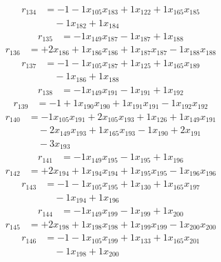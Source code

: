 \[\begin{aligned}
r_{134} &= - 1 - 1 x_{105} x_{183} + 1 x_{122} + 1 x_{165} x_{185} \\
 &\quad - 1 x_{182} + 1 x_{184}
\end{aligned}\]
\[\begin{aligned}
r_{135} &= - 1 x_{149} x_{187} - 1 x_{187} + 1 x_{188}
\end{aligned}\]
\[\begin{aligned}
r_{136} &= + 2 x_{186} + 1 x_{186} x_{186} + 1 x_{187} x_{187} - 1 x_{188} x_{188}
\end{aligned}\]
\[\begin{aligned}
r_{137} &= - 1 - 1 x_{105} x_{187} + 1 x_{125} + 1 x_{165} x_{189} \\
 &\quad - 1 x_{186} + 1 x_{188}
\end{aligned}\]
\[\begin{aligned}
r_{138} &= - 1 x_{149} x_{191} - 1 x_{191} + 1 x_{192}
\end{aligned}\]
\[\begin{aligned}
r_{139} &= - 1 + 1 x_{190} x_{190} + 1 x_{191} x_{191} - 1 x_{192} x_{192}
\end{aligned}\]
\[\begin{aligned}
r_{140} &= - 1 x_{105} x_{191} + 2 x_{105} x_{193} + 1 x_{126} + 1 x_{149} x_{191} \\
 &\quad - 2 x_{149} x_{193} + 1 x_{165} x_{193} - 1 x_{190} + 2 x_{191} \\
 &\quad - 3 x_{193}
\end{aligned}\]
\[\begin{aligned}
r_{141} &= - 1 x_{149} x_{195} - 1 x_{195} + 1 x_{196}
\end{aligned}\]
\[\begin{aligned}
r_{142} &= + 2 x_{194} + 1 x_{194} x_{194} + 1 x_{195} x_{195} - 1 x_{196} x_{196}
\end{aligned}\]
\[\begin{aligned}
r_{143} &= - 1 - 1 x_{105} x_{195} + 1 x_{130} + 1 x_{165} x_{197} \\
 &\quad - 1 x_{194} + 1 x_{196}
\end{aligned}\]
\[\begin{aligned}
r_{144} &= - 1 x_{149} x_{199} - 1 x_{199} + 1 x_{200}
\end{aligned}\]
\[\begin{aligned}
r_{145} &= + 2 x_{198} + 1 x_{198} x_{198} + 1 x_{199} x_{199} - 1 x_{200} x_{200}
\end{aligned}\]
\[\begin{aligned}
r_{146} &= - 1 - 1 x_{105} x_{199} + 1 x_{133} + 1 x_{165} x_{201} \\
 &\quad - 1 x_{198} + 1 x_{200}
\end{aligned}\]
